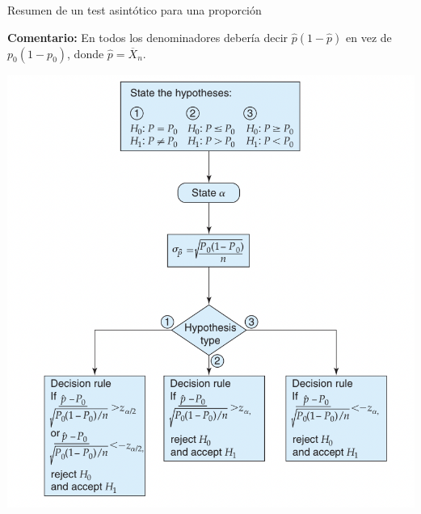 \documentclass{beamer}
\theoremstyle{definition}
\begin{document}
\begin{frame}{\color{rosee}Resumen de un test asintótico para una proporción}

\textbf{Comentario:} En todos los denominadores debería decir $\widehat{p}(1-\widehat{p})$ en vez de $p_0(1-p_0)$, donde $\widehat{p}=\overline{X}_n$.
    \begin{center}
        \includegraphics[scale=0.4]{slides6/img/testprop.png}
    \end{center}
\end{frame}
\end{document}
